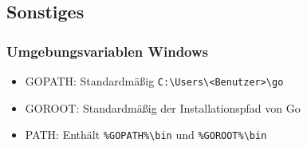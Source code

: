 \documentclass[twoside,a4paper,12pt]{article}
\begin{document}
\subsection{Sonstiges}
\subsubsection{Umgebungsvariablen Windows}
\begin{itemize}
  \item GOPATH: Standardmäßig \verb|C:\Users\<Benutzer>\go|
  \item GOROOT: Standardmäßig der Installationspfad von Go
  \item PATH: Enthält \verb|%GOPATH%\bin| und \verb|%GOROOT%\bin|
\end{itemize}
\end{document}

